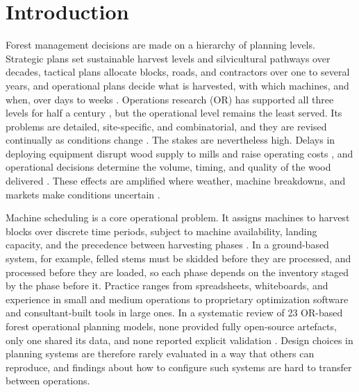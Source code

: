 \section{Introduction}

Forest management decisions are made on a hierarchy of planning levels. Strategic plans set
sustainable harvest levels and silvicultural pathways over decades, tactical plans allocate
blocks, roads, and contractors over one to several years, and operational plans decide what is
harvested, with which machines, and when, over days to weeks
\citep{martell1998forest,bouchard2017integrated}. Operations research (OR) has supported all three
levels for half a century \citep{ronnqvist2023fifty}, but the operational level remains the least
served. Its problems are detailed, site-specific, and combinatorial, and they are revised
continually as conditions change \citep{epstein2007harvest,ronnqvist2015operations,
santos2019mathematical}. The stakes are nevertheless high. Delays in deploying equipment disrupt
wood supply to mills and raise operating costs \citep{d2008using,alayet2013planning}, and
operational decisions determine the volume, timing, and quality of the wood delivered
\citep{shahi2018integrating}. These effects are amplified where weather, machine breakdowns, and
markets make conditions uncertain \citep{arora2023detailed}.

Machine scheduling is a core operational problem. It assigns machines to harvest blocks over
discrete time periods, subject to machine availability, landing capacity, and the precedence
between harvesting phases \citep{corner2005scheduling}. In a ground-based system, for example,
felled stems must be skidded before they are processed, and processed before they are loaded, so
each phase depends on the inventory staged by the phase before it. Practice ranges from
spreadsheets, whiteboards, and experience in small and medium operations to proprietary
optimization software and consultant-built tools in large ones. In a systematic review of 23
OR-based forest operational planning models, none provided fully open-source artefacts, only one shared its data, and none reported explicit validation \citep{jaffray2026systematic,viana2023modelling}.
Design choices in planning systems are therefore rarely evaluated in a way that others can
reproduce, and findings about how to configure such systems are hard to transfer between
operations.

